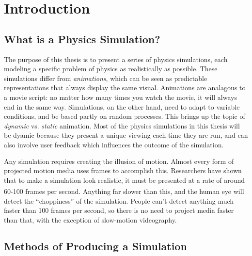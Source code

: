 
\chapter*{Introduction}
\label{intro} %



\section{What is a Physics Simulation?}

\hspace{.5cm} The purpose of this thesis is to present a series of physics simulations, each modeling a specific problem of physics as realistically as possible.  These simulations differ from \textit{animations}, which can be seen as predictable representations that always display the same visual.  Animations are analagous to a movie script: no matter how many times you watch the movie, it will always end in the same way.  Simulations, on the other hand, need to adapt to variable conditions, and be based partly on random processes.  This brings up the topic of \textit{dynamic} vs. \textit{static} animation.  Most of the physics simulations in this thesis will be dyamic because they present a unique viewing each time they are run, and can also involve user feedback which influences the outcome of the simulation.

Any simulation requires creating the illusion of motion.  Almost every form of projected motion media uses frames to accomplish this.  Researchers have shown that to make a simulation look realistic, it must be presented at a rate of around 60-100 frames per second.\textsuperscript{\cite{jsbook}}  Anything far slower than this, and the human eye will detect the ``choppiness'' of the simulation.  People can't detect anything much faster than 100 frames per second, so there is no need to project media faster than that, with the exception of slow-motion videography.  






\section{Methods of Producing a Simulation}

